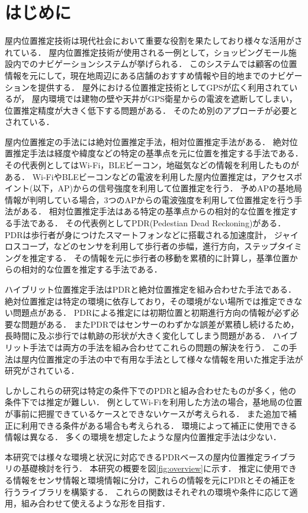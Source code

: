 
\section{はじめに}
屋内位置推定技術は現代社会において重要な役割を果たしており様々な活用がされている．
屋内位置推定技術が使用される一例として，ショッピングモール施設内でのナビゲーションシステムが挙げられる\cite{burasapo}．
このシステムでは顧客の位置情報を元にして，現在地周辺にある店舗のおすすめ情報や目的地までのナビゲーションを提供する．
屋外における位置推定技術としてGPSが広く利用されているが，
屋内環境では建物の壁や天井がGPS衛星からの電波を遮断してしまい，
位置推定精度が大きく低下する問題がある．
そのため別のアプローチが必要とされている．

屋内位置推定の手法には絶対位置推定手法，相対位置推定手法がある．
絶対位置推定手法は経度や緯度などの特定の基準点を元に位置を推定する手法である．
その代表例としてはWi-Fi，BLEビーコン，地磁気などの情報を利用したものがある．
Wi-FiやBLEビーコンなどの電波を利用した屋内位置推定は，アクセスポイント(以下，AP)からの信号強度を利用して位置推定を行う．
予めAPの基地局情報が判明している場合，3つのAPからの電波強度を利用して位置推定を行う手法がある．
相対位置推定手法はある特定の基準点からの相対的な位置を推定する手法である．
その代表例としてPDR(Pedestian Dead Reckoning)がある．
PDRは歩行者が身につけたスマートフォンなどに搭載される加速度計，
ジャイロスコープ，などのセンサを利用して歩行者の歩幅，進行方向，ステップタイミングを推定する．
その情報を元に歩行者の移動を累積的に計算し，基準位置からの相対的な位置を推定する手法である．


ハイブリット位置推定手法はPDRと絶対位置推定を組み合わせた手法である．
絶対位置推定は特定の環境に依存しており，その環境がない場所では推定できない問題点がある．
PDRによる推定には初期位置と初期進行方向の情報が必ず必要な問題がある．
またPDRではセンサーのわずかな誤差が累積し続けるため，長時間に及ぶ歩行では軌跡の形状が大きく変化してしまう問題がある．
ハイブリット手法では両方の手法を組み合わせてこれらの問題の解決を行う．
この手法は屋内位置推定の手法の中で有用な手法として様々な情報を用いた推定手法が研究がされている．

しかしこれらの研究は特定の条件下でのPDRと組み合わせたものが多く，他の条件下では推定が難しい．
例としてWi-Fiを利用した方法の場合，基地局の位置が事前に把握できているケースとできないケースが考えられる．
また追加で補正に利用できる条件がある場合も考えられる．
環境によって補正に使用できる情報は異なる．
多くの環境を想定したような屋内位置推定手法は少ない．

本研究では様々な環境と状況に対応できるPDRベースの屋内位置推定ライブラリの基礎検討を行う．
本研究の概要を図\ref{fig:overview}に示す．
推定に使用できる情報をセンサ情報と環境情報に分け，これらの情報を元にPDRとその補正を行うライブラリを構築する．
これらの関数はそれぞれの環境や条件に応じて適用，組み合わせて使えるような形を目指す．

